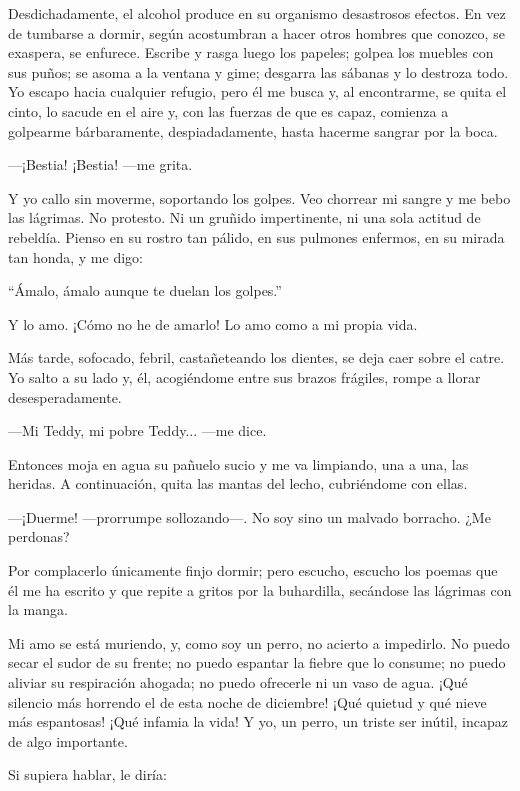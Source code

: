 \documentclass[14pt,a5paper,oneside,final]{extbook}
\begin{document}
Desdichadamente, el alcohol produce en su organismo desastrosos efectos. En vez de tumbarse a dormir, según acostumbran a hacer otros hombres que conozco, se exaspera, se enfurece. Escribe y rasga luego los papeles; golpea los muebles con sus puños; se asoma a la ventana y gime; desgarra las sábanas y lo destroza todo. Yo escapo hacia cualquier refugio, pero él me busca y, al encontrarme, se quita el cinto, lo sacude en el aire y, con las fuerzas de que es capaz, comienza a golpearme bárbaramente, despiadadamente, hasta hacerme sangrar por la boca.

---¡Bestia! ¡Bestia! ---me grita.

Y yo callo sin moverme, soportando los golpes. Veo chorrear mi sangre y me bebo las lágrimas. No protesto. Ni un gruñido impertinente, ni una sola actitud de rebeldía. Pienso en su rostro tan pálido, en sus pulmones enfermos, en su mirada tan honda, y me digo:

``Ámalo, ámalo aunque te duelan los golpes.''

Y lo amo. ¡Cómo no he de amarlo! Lo amo como a mi propia vida.

Más tarde, sofocado, febril, castañeteando los dientes, se deja caer sobre el catre. Yo salto a su lado y, él, acogiéndome entre sus brazos frágiles, rompe a llorar desesperadamente.

---Mi Teddy, mi pobre Teddy... ---me dice. 

Entonces moja en agua su pañuelo sucio y me va limpiando, una a una, las heridas. A continuación, quita las mantas del lecho, cubriéndome con ellas.

---¡Duerme! ---prorrumpe sollozando---. No soy sino un malvado borracho. ¿Me perdonas?

Por complacerlo únicamente finjo dormir; pero escucho, escucho los poemas que él me ha escrito y que repite a gritos por la buhardilla, secándose las lágrimas con la manga.

Mi amo se está muriendo, y, como soy un perro, no acierto a impedirlo. No puedo secar el sudor de su frente; no puedo espantar la fiebre que lo consume; no puedo aliviar su respiración ahogada; no puedo ofrecerle ni un vaso de agua. ¡Qué silencio más horrendo el de esta noche de diciembre! ¡Qué quietud y qué nieve más espantosas! ¡Qué infamia la vida! Y yo, un perro, un triste ser inútil, incapaz de algo importante.

Si supiera hablar, le diría:
\end{document}
